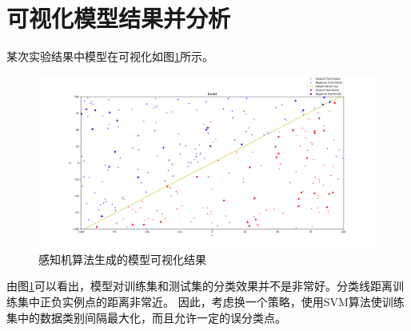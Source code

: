 \documentclass[UTF8,twoside,fontset=none,heading=true,scheme=chinese]{ctexart}
\begin{document}
    \section{可视化模型结果并分析}
    \noindent 某次实验结果中模型在可视化如图\ref{fig:per}所示。
    \begin{figure}[htb]
        \centering
        \includegraphics[scale=0.4]{../Model.png}
        \caption{感知机算法生成的模型可视化结果}
        \label{fig:per}
    \end{figure}
    由图\ref{fig:per}可以看出，模型对训练集和测试集的分类效果并不是非常好。分类线距离训练集中正负实例点的距离非常近。
    因此，考虑换一个策略，使用SVM算法使训练集中的数据类别间隔最大化，而且允许一定的误分类点。
\end{document}
